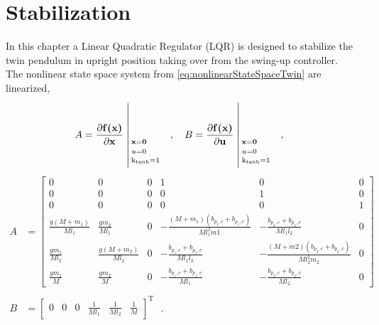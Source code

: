 \chapter{Stabilization}
%
%
In this chapter a Linear Quadratic Regulator (LQR) is designed to stabilize the twin pendulum in upright position taking over from the swing-up controller.\\
The nonlinear state space system from \autoref{eq:nonlinearStateSpaceTwin} are linearized,
\begin{align}
  A &= \frac{\partial \vec{f(x)}}{\partial \vec{x}} \whereThree{\vec{x}=\vec{0}\ \ \ \ }{u=0\ \ \ \ }{\text{k}_\text{tanh}=1} \ \ \ , \ \ \
  B = \frac{\partial \vec{f(x)}}{\partial \vec{u}}  \whereThree{\vec{x}=\vec{0}\ \ \ \ }{u=0\ \ \ \ }{\text{k}_\text{tanh}=1} \ \ \ ,
  \label{eq:linearTwin_AB}
\end{align}
\begin{align}
  A &= 
  \begin{bmatrix}
    0                         & 0                         & 0 & 1                                                    & 0                                                    & 0 \\
    0                         & 0                         & 0 & 0                                                    & 1                                                    & 0 \\
    0                         & 0                         & 0 & 0                                                    & 0                                                    & 1 \\
    \frac{g (M + m_1)}{M l_1} & \frac{g m_2}{M l_1}       & 0 & -\frac{(M + m_1)(b_{p_1,c} + b_{p_1,v})}{M l_1^2 m1} & -\frac{b_{p_2,c} + b_{p_2,v}}{M l_1 l_2}             & 0 \\
    \frac{g m_1}{M l_2}       & \frac{g (M + m_2)}{M l_2} & 0 & -\frac{b_{p_1,c} + b_{p_1,v}}{M l_1 l_2}             & -\frac{(M + m2)(b_{p_2,c} + b_{p_2,v})}{M l_2^2 m_2} & 0 \\
    \frac{g m_1}{M}           & \frac{g m_2}{M}           & 0 & -\frac{b_{p_1,c} + b_{p_1,v}}{M l_1}                 & -\frac{b_{p_2,c} + b_{p_2,v}}{M l_2}                 & 0
  \end{bmatrix}  \label{eq:linearTwin_A} \\
  \nonumber \\
  B &= 
  \begin{bmatrix}
    0  &  0  &  0  &  \frac{1}{M l_1} & \frac{1}{M l_2} & \frac{1}{M}
  \end{bmatrix}^{\mathrm{T}}   \ \ \ .
  \label{eq:linearTwin_B}
\end{align}
